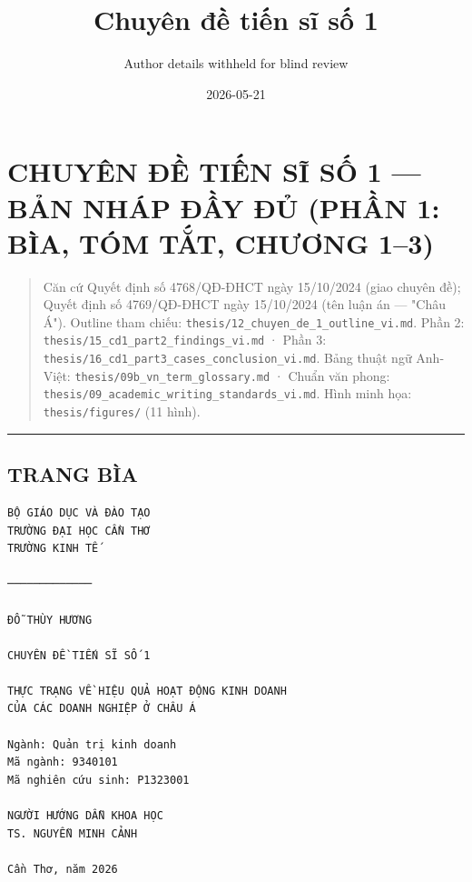 \documentclass[12pt,a4paper]{article}
\title{Chuyên đề tiến sĩ số 1}
\author{Author details withheld for blind review}
\date{2026-05-21}
\begin{document}
\maketitle

\hypertarget{chuyuxean-ux111ux1ec1-tiux1ebfn-sux129-sux1ed1-1--bux1ea3n-nhuxe1p-ux111ux1ea7y-ux111ux1ee7-phux1ea7n-1-buxeca-tuxf3m-tux1eaft-chux1b0ux1a1ng-13}{%
\section{CHUYÊN ĐỀ TIẾN SĨ SỐ 1 --- BẢN NHÁP ĐẦY ĐỦ (PHẦN 1: BÌA, TÓM
TẮT, CHƯƠNG
1--3)}\label{chuyuxean-ux111ux1ec1-tiux1ebfn-sux129-sux1ed1-1--bux1ea3n-nhuxe1p-ux111ux1ea7y-ux111ux1ee7-phux1ea7n-1-buxeca-tuxf3m-tux1eaft-chux1b0ux1a1ng-13}}

\begin{quote}
Căn cứ Quyết định số 4768/QĐ-ĐHCT ngày 15/10/2024 (giao chuyên đề);
Quyết định số 4769/QĐ-ĐHCT ngày 15/10/2024 (tên luận án --- "Châu Á").
Outline tham chiếu: \texttt{thesis/12\_chuyen\_de\_1\_outline\_vi.md}.
Phần 2: \texttt{thesis/15\_cd1\_part2\_findings\_vi.md} · Phần 3:
\texttt{thesis/16\_cd1\_part3\_cases\_conclusion\_vi.md}. Bảng thuật ngữ
Anh-Việt: \texttt{thesis/09b\_vn\_term\_glossary.md} · Chuẩn văn phong:
\texttt{thesis/09\_academic\_writing\_standards\_vi.md}. Hình minh họa:
\texttt{thesis/figures/} (11 hình).
\end{quote}

\begin{center}\rule{0.5\linewidth}{0.5pt}\end{center}

\hypertarget{trang-buxeca}{%
\subsection{TRANG BÌA}\label{trang-buxeca}}

\begin{verbatim}
BỘ GIÁO DỤC VÀ ĐÀO TẠO
TRƯỜNG ĐẠI HỌC CẦN THƠ
TRƯỜNG KINH TẾ

─────────────

ĐỖ THÙY HƯƠNG

CHUYÊN ĐỀ TIẾN SĨ SỐ 1

THỰC TRẠNG VỀ HIỆU QUẢ HOẠT ĐỘNG KINH DOANH
CỦA CÁC DOANH NGHIỆP Ở CHÂU Á

Ngành: Quản trị kinh doanh
Mã ngành: 9340101
Mã nghiên cứu sinh: P1323001

NGƯỜI HƯỚNG DẪN KHOA HỌC
TS. NGUYỄN MINH CẢNH

Cần Thơ, năm 2026
\end{verbatim}
\end{document}
